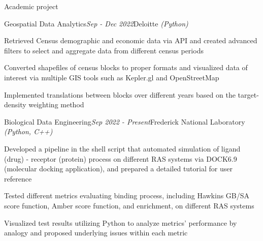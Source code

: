 \documentclass{resume} %
\begin{document}
	
\begin{rSection}{Academic project} 
	\begin{rSubsection}{Geospatial Data Analytics}{\em Sep - Dec 2022}{Deloitte \emph{(Python)}}{}
		\item Retrieved Census demographic and economic data via API and created advanced filters to select and aggregate data from different census periods 		
		\item Converted shapefiles of census blocks to proper formats and visualized data of interest via multiple GIS tools such as Kepler.gl and OpenStreetMap
		\item Implemented translations between blocks over different years based on the target-density weighting method
	\end{rSubsection}
	

	
	\begin{rSubsection}{Biological Data Engineering}{\em Sep 2022 - Present}{Frederick National Laboratory \emph{(Python, C++)}}{}
		\item Developed a pipeline in the shell script that automated simulation of ligand (drug) - receptor (protein) process on different RAS systems via DOCK6.9 (molecular docking application), and prepared a detailed tutorial for user reference
		\item Tested different metrics evaluating binding process, including Hawkins GB/SA score function, Amber score function, and enrichment, on different RAS systems
		\item Visualized test results utilizing Python to analyze metrics’ performance by analogy and proposed underlying issues within each metric
	\end{rSubsection}

\end{rSection}
	
\end{document}
